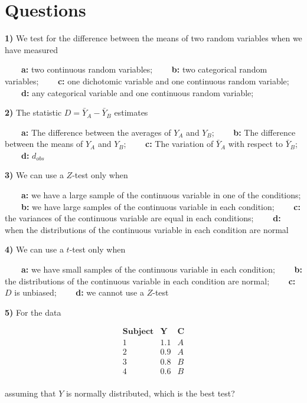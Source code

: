 \documentclass[
]{book}
\begin{document}
\hypertarget{questions-12}{%
\section{Questions}\label{questions-12}}

\textbf{1)} We test for the difference between the means of two random variables when we have measured

\textbf{\(\qquad\)a:} two continuous random variables;
\textbf{\(\qquad\)b:} two categorical random variables;
\textbf{\(\qquad\)c:} one dichotomic variable and one continuous random variable;
\textbf{\(\qquad\)d:} any categorical variable and one continuous random variable;

\textbf{2)} The statistic \(D=\bar{Y}_A-\bar{Y}_B\) estimates

\textbf{\(\qquad\)a:} The difference between the averages of \(Y_A\) and \(Y_B\);
\textbf{\(\qquad\)b:} The difference between the means of \(Y_A\) and \(Y_B\);
\textbf{\(\qquad\)c:} The variation of \(\bar{Y}_A\) with respect to \(\bar{Y}_B\);
\textbf{\(\qquad\)d:} \(d_{obs}\)

\textbf{3)} We can use a \(Z\)-test only when

\textbf{\(\qquad\)a:} we have a large sample of the continuous variable in one of the conditions;
\textbf{\(\qquad\)b:} we have large samples of the continuous variable in each condition;
\textbf{\(\qquad\)c:} the variances of the continuous variable are equal in each conditions;
\textbf{\(\qquad\)d:} when the distributions of the continuous variable in each condition are normal

\textbf{4)} We can use a \(t\)-test only when

\textbf{\(\qquad\)a:} we have small samples of the continuous variable in
each condition;
\textbf{\(\qquad\)b:} the distributions of the continuous variable in each condition are normal;
\textbf{\(\qquad\)c:} \(D\) is unbiased;
\textbf{\(\qquad\)d:} we cannot use a \(Z\)-test

\textbf{5)} For the data

\[
\begin{array}{ccc}
\mathbf{Subject} & \mathbf{Y} & \mathbf{C} \\ 
1&1.1&A\\ 
2&0.9&A\\ 
3&0.8&B\\ 
4&0.6&B\\ 
\end{array}
\]

assuming that \(Y\) is normally distributed, which is the best test?
\end{document}
